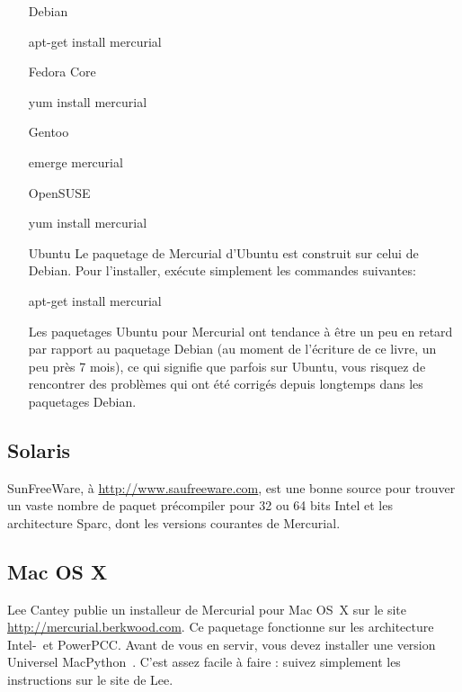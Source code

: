 \begin{itemize}
\item[Debian]
  \begin{codesample4}
    apt-get install mercurial
  \end{codesample4}

\item[Fedora Core]
  \begin{codesample4}
    yum install mercurial
  \end{codesample4}

\item[Gentoo]
  \begin{codesample4}
    emerge mercurial
  \end{codesample4}

\item[OpenSUSE]
  \begin{codesample4}
    yum install mercurial
  \end{codesample4}

\item[Ubuntu] Le paquetage de Mercurial d'Ubuntu est construit sur celui de Debian. Pour
  l'installer, exécute simplement les commandes suivantes:
  \begin{codesample4}
    apt-get install mercurial
  \end{codesample4}
  Les paquetages Ubuntu pour Mercurial ont tendance à être un peu en retard
  par rapport au paquetage Debian (au moment de l'écriture de ce livre, un 
  peu près 7 mois), ce qui signifie que parfois sur Ubuntu, vous risquez
  de rencontrer des problèmes qui ont été corrigés depuis longtemps dans
  les paquetages Debian.
\end{itemize}

\subsection{Solaris}

SunFreeWare, à \url{http://www.saufreeware.com}, est une bonne source 
pour trouver un vaste nombre de paquet précompiler pour 32 ou 64 bits
Intel et les architecture Sparc, dont les versions courantes de Mercurial.

\subsection{Mac OS X}

Lee Cantey publie un installeur de Mercurial pour Mac OS~X sur le site 
\url{http://mercurial.berkwood.com}.  Ce paquetage fonctionne sur les 
architecture Intel-~et PowerPCC. Avant de vous en servir, vous devez
installer une version Universel MacPython~\cite{web:macpython}. C'est
assez facile à faire : suivez simplement les instructions sur le site
de Lee.

